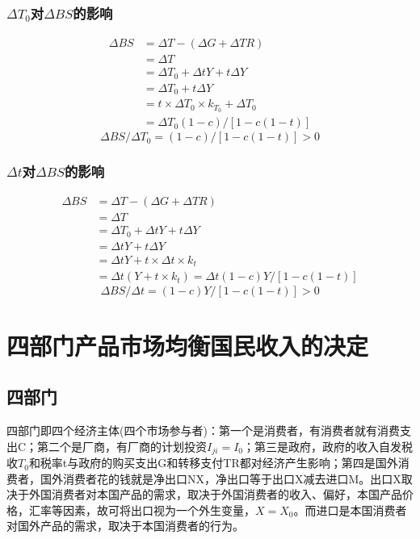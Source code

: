 \documentclass{article}
\begin{document}
\subsubsection{$ \Delta T_0 $对$ \Delta BS $的影响}
\begin{equation*}
\begin{split}
\Delta BS&=\Delta T-(\Delta G+\Delta TR)\\
&=\Delta T\\
&=\Delta T_0+\Delta tY+t\Delta Y\\
&=\Delta T_0+t\Delta Y\\
&=t\times\Delta T_0\times k_{T_0}+\Delta T_0\\
&=\Delta T_0(1-c)/[1-c(1-t)]
\end{split}
\end{equation*}
\[
\Delta BS/\Delta T_0=(1-c)/[1-c(1-t)]>0
\]

\subsubsection{$ \Delta t $对$ \Delta BS $的影响}
\begin{equation*}
\begin{split}
\Delta BS&=\Delta T-(\Delta G+\Delta TR)\\
&=\Delta T\\
&=\Delta T_0+\Delta tY+t\Delta Y\\
&=\Delta tY+t\Delta Y\\
&=\Delta tY+t\times\Delta t\times k_t\\
&=\Delta t(Y+t\times k_t)=\Delta t(1-c)Y/[1-c(1-t)]
\end{split}
\end{equation*}
\[
\Delta BS/\Delta t=(1-c)Y/[1-c(1-t)]>0
\]

\section{四部门产品市场均衡国民收入的决定}
\subsection{四部门}
四部门即四个经济主体(四个市场参与者)：第一个是消费者，有消费者就有消费支出C；第二个是厂商，有厂商的计划投资$ I_{ji}=I_0 $；第三是政府，政府的收入自发税收$ T_0 $和税率t与政府的购买支出G和转移支付TR都对经济产生影响；第四是国外消费者，国外消费者花的钱就是净出口NX，净出口等于出口X减去进口M。出口X取决于外国消费者对本国产品的需求，取决于外国消费者的收入、偏好，本国产品价格，汇率等因素，故可将出口视为一个外生变量，$ X=X_0 $。而进口是本国消费者对国外产品的需求，取决于本国消费者的行为。
\end{document}
